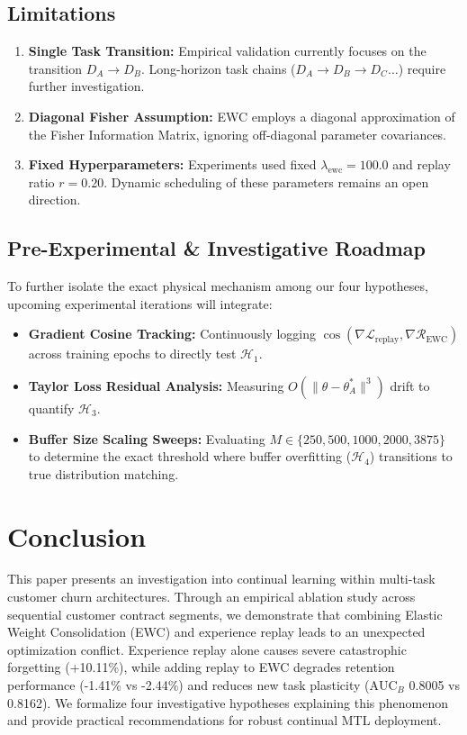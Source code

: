 \documentclass{article}
\begin{document}
\subsection{Limitations}
\begin{enumerate}
    \item \textbf{Single Task Transition:} Empirical validation currently focuses on the transition $D_A \to D_B$. Long-horizon task chains ($D_A \to D_B \to D_C \dots$) require further investigation.
    \item \textbf{Diagonal Fisher Assumption:} EWC employs a diagonal approximation of the Fisher Information Matrix, ignoring off-diagonal parameter covariances.
    \item \textbf{Fixed Hyperparameters:} Experiments used fixed $\lambda_{\text{ewc}} = 100.0$ and replay ratio $r = 0.20$. Dynamic scheduling of these parameters remains an open direction.
\end{enumerate}

\subsection{Pre-Experimental \& Investigative Roadmap}
To further isolate the exact physical mechanism among our four hypotheses, upcoming experimental iterations will integrate:
\begin{itemize}
    \item \textbf{Gradient Cosine Tracking:} Continuously logging $\cos(\nabla \mathcal{L}_{\text{replay}}, \nabla \mathcal{R}_{\text{EWC}})$ across training epochs to directly test $\mathcal{H}_1$.
    \item \textbf{Taylor Loss Residual Analysis:} Measuring $O(\|\theta - \theta_A^*\|^3)$ drift to quantify $\mathcal{H}_3$.
    \item \textbf{Buffer Size Scaling Sweeps:} Evaluating $M \in \{250, 500, 1000, 2000, 3875\}$ to determine the exact threshold where buffer overfitting ($\mathcal{H}_4$) transitions to true distribution matching.
\end{itemize}

\section{Conclusion}
This paper presents an investigation into continual learning within multi-task customer churn architectures. Through an empirical ablation study across sequential customer contract segments, we demonstrate that combining Elastic Weight Consolidation (EWC) and experience replay leads to an unexpected optimization conflict. Experience replay alone causes severe catastrophic forgetting (+10.11\%), while adding replay to EWC degrades retention performance (-1.41\% vs -2.44\%) and reduces new task plasticity ($\text{AUC}_B$ 0.8005 vs 0.8162). We formalize four investigative hypotheses explaining this phenomenon and provide practical recommendations for robust continual MTL deployment.
\end{document}
